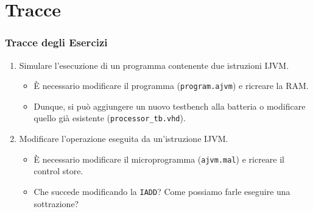 \documentclass{beamer}
\begin{document}
\section{Tracce}
\begin{frame}
  \frametitle{Tracce degli Esercizi}
  \begin{enumerate}
    \item Simulare l'esecuzione di un programma contenente due istruzioni IJVM.
    \begin{itemize}
      \item È necessario modificare il programma (\lstinline{program.ajvm}) e
      ricreare la RAM.
      \item Dunque, si può aggiungere un nuovo testbench alla batteria o
      modificare quello già esistente (\lstinline{processor_tb.vhd}).
    \end{itemize}
    \item Modificare l'operazione eseguita da un'istruzione IJVM.
    \begin{itemize}
      \item È necessario modificare il microprogramma (\lstinline{ajvm.mal}) e
      ricreare il control store.
      \item Che succede modificando la \lstinline{IADD}? Come possiamo farle
      eseguire una sottrazione?
    \end{itemize}
  \end{enumerate}
\end{frame}
\end{document}
